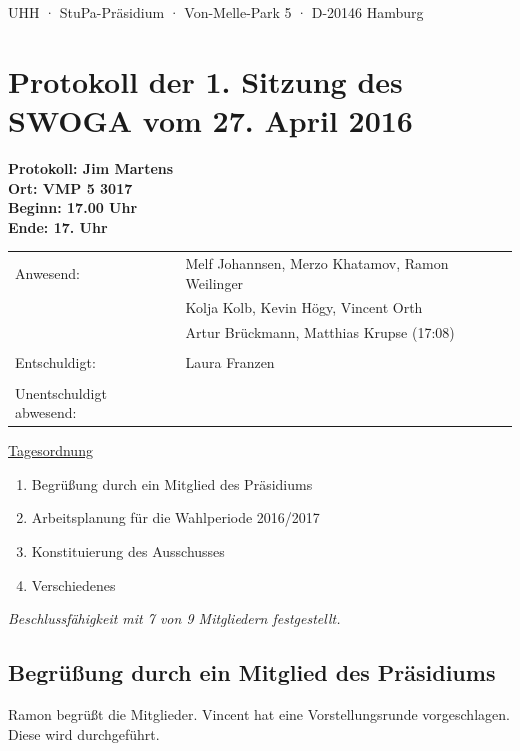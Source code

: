 \documentclass[ngerman,headheight=70pt]{scrartcl}
\begin{document}
    UHH · StuPa-Präsidium · Von-Melle-Park 5 · D-20146 Hamburg

    \section*{Protokoll der 1. Sitzung des SWOGA vom 27. April 2016}

    \textbf{Protokoll: Jim Martens}\\
    \textbf{Ort: VMP 5 3017}\\
    \textbf{Beginn: 17.00 Uhr}\\
    \textbf{Ende: 17. Uhr}

    \vspace{0.5cm}
    \begin{tabular}{ll}
        Anwesend: & Melf Johannsen, Merzo Khatamov, Ramon Weilinger \\
                  & Kolja Kolb, Kevin Högy, Vincent Orth\\
                  & Artur Brückmann, Matthias Krupse (17:08) \\
                  & \\
        Entschuldigt: & Laura Franzen \\
                      &\\
        Unentschuldigt abwesend: &  \\
    \end{tabular}

    \underline{Tagesordnung}
    \begin{enumerate}[label={\textbf{Top \theenumi}},leftmargin=*]
        \item Begrüßung durch ein Mitglied des Präsidiums
        \item Arbeitsplanung für die Wahlperiode 2016/2017
        \item Konstituierung des Ausschusses
        \item Verschiedenes
    \end{enumerate}

    \textit{Beschlussfähigkeit mit 7 von 9 Mitgliedern festgestellt.}

    \subsection{Begrüßung durch ein Mitglied des Präsidiums}

    Ramon begrüßt die Mitglieder. Vincent hat eine Vorstellungsrunde
    vorgeschlagen. Diese wird durchgeführt.
\end{document}

